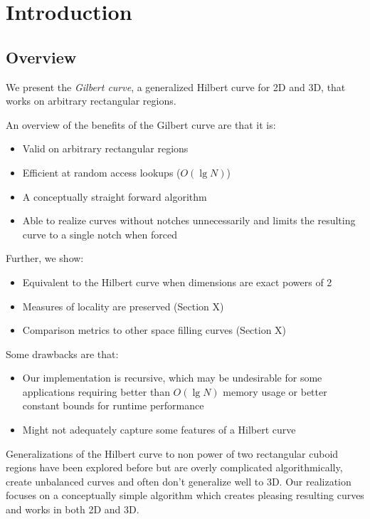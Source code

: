 \section{Introduction}

\subsection{Overview}

We present the \textit{Gilbert curve}, a generalized Hilbert curve for 2D and 3D,
that works on arbitrary rectangular regions.

An overview of the benefits of the Gilbert curve are that it is:

\begin{itemize}
  \item Valid on arbitrary rectangular regions
  \item Efficient at random access lookups ($O(\lg N)$)
  \item A conceptually straight forward algorithm
  \item Able to realize curves without notches unnecessarily and limits the resulting curve
        to a single notch when forced
\end{itemize}

Further, we show:

\begin{itemize}
  \item Equivalent to the Hilbert curve when dimensions are exact powers of 2
  \item Measures of locality are preserved (Section X)
  \item Comparison metrics to other space filling curves (Section X)
\end{itemize}

Some drawbacks are that:

\begin{itemize}
  \item Our implementation is recursive,
        which may be undesirable for some applications requiring better than $O( \lg N)$
        memory usage or better constant bounds for runtime performance
  \item Might not adequately capture some features of a Hilbert curve
\end{itemize}


Generalizations of the Hilbert curve to non power of two rectangular cuboid regions
have been explored before but are overly complicated algorithmically, create unbalanced
curves and often don't generalize well to 3D.
Our realization focuses on a conceptually simple algorithm which creates pleasing
resulting curves and works in both 2D and 3D.

